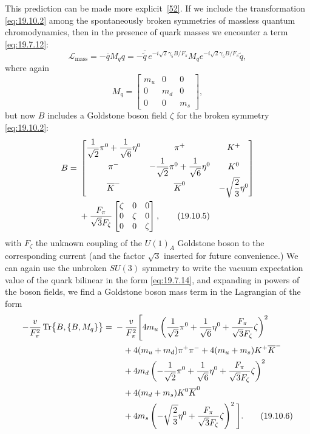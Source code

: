 This prediction can be made more explicit~\hyperref[ch19-ref-52]{[52]}. If we include the transformation \eqref{eq:19.10.2} among the spontaneously broken symmetries of massless quantum chromodynamics, then in the presence of quark masses we encounter a term \eqref{eq:19.7.12}:
\begin{equation}
\mathcal L_{\mathrm{mass}}
=-\overline q M_q q
=-\overline{\widetilde q}\,
e^{-i\sqrt{2}\gamma_5B/F_\pi}
M_q
e^{-i\sqrt{2}\gamma_5B/F_\pi}
\widetilde q,
\tag{19.10.3}\label{eq:19.10.3}
\end{equation}
where again
\begin{equation}
M_q=
\begin{bmatrix}
m_u&0&0\\
0&m_d&0\\
0&0&m_s
\end{bmatrix},
\tag{19.10.4}\label{eq:19.10.4}
\end{equation}
but now $B$ includes a Goldstone boson field $\zeta$ for the broken symmetry \eqref{eq:19.10.2}:
\begin{align}
B={}&
\begin{bmatrix}
\dfrac{1}{\sqrt2}\pi^0+\dfrac{1}{\sqrt6}\eta^0
&\pi^+&K^+\\[4pt]
\pi^-&
-\dfrac{1}{\sqrt2}\pi^0+\dfrac{1}{\sqrt6}\eta^0
&K^0\\[4pt]
\overline K^-&\overline K^0&-\sqrt{\dfrac23}\eta^0
\end{bmatrix}
\notag\\
&+\frac{F_\pi}{\sqrt3F_\zeta}
\begin{bmatrix}
\zeta&0&0\\
0&\zeta&0\\
0&0&\zeta
\end{bmatrix},
\tag{19.10.5}\label{eq:19.10.5}
\end{align}
with $F_\zeta$ the unknown coupling of the $U(1)_A$ Goldstone boson to the corresponding current (and the factor $\sqrt3$ inserted for future convenience.) We can again use the unbroken $SU(3)$ symmetry to write the vacuum expectation value of the quark bilinear in the form \eqref{eq:19.7.14}, and expanding in powers of the boson fields, we find a Goldstone boson mass term in the Lagrangian of the form
\begin{align}
-\frac{v}{F_\pi^2}
\operatorname{Tr}\bigl\{B,\{B,M_q\}\bigr\}
={}&-\frac{v}{F_\pi^2}\Bigg[
4m_u\left(
\frac{1}{\sqrt2}\pi^0+\frac{1}{\sqrt6}\eta^0
+\frac{F_\pi}{\sqrt3F_\zeta}\zeta
\right)^2
\notag\\
&\quad+4(m_u+m_d)\pi^+\pi^-
+4(m_u+m_s)K^+\overline K^-
\notag\\
&\quad+4m_d\left(
-\frac{1}{\sqrt2}\pi^0+\frac{1}{\sqrt6}\eta^0
+\frac{F_\pi}{\sqrt3F_\zeta}\zeta
\right)^2
\notag\\
&\quad+4(m_d+m_s)K^0\overline K^0
\notag\\
&\quad+4m_s\left(
-\sqrt{\frac23}\eta^0
+\frac{F_\pi}{\sqrt3F_\zeta}\zeta
\right)^2
\Bigg].
\tag{19.10.6}\label{eq:19.10.6}
\end{align}
